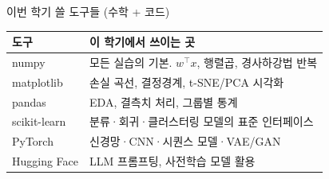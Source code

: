 \begin{frame}{이번 학기 쓸 도구들 (수학 + 코드)}
  \small
  \vfill
  \centering
  \begin{tabular}{@{}ll@{}}
    \toprule
    도구 & 이 학기에서 쓰이는 곳 \\
    \midrule
    numpy & 모든 실습의 기본. $w^\top x$, 행렬곱, 경사하강법 반복 \\
    matplotlib & 손실 곡선, 결정경계, t-SNE/PCA 시각화 \\
    pandas & EDA, 결측치 처리, 그룹별 통계 \\
    scikit-learn & 분류·회귀·클러스터링 모델의 표준 인터페이스 \\
    PyTorch & 신경망·CNN·시퀀스 모델·VAE/GAN \\
    Hugging Face & LLM 프롬프팅, 사전학습 모델 활용 \\
    \bottomrule
  \end{tabular}
  \vfill
\end{frame}
